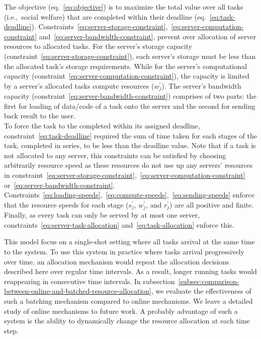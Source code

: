 The objective (eq.~\ref{eq:objective}) is to maximize the total value over all tasks (i.e.,\ social welfare) that
are completed within their deadline (eq.~\ref{eq:task-deadline}).
Constraints~\ref{eq:server-storage-constraint},~\ref{eq:server-computation-constraint}
and~\ref{eq:server-bandwidth-constraint}, prevent over allocation of server resources to allocated tasks.
For the server's storage capacity (constraint~\ref{eq:server-storage-constraint}), each server's storage must be less
than the allocated task's storage requirements. While for the server's computational capacity
(constraint~\ref{eq:server-computation-constraint}), the capacity is limited by a server's allocated tasks
compute resources ($w^{'}_j$). The server's bandwidth capacity (constraint~\ref{eq:server-bandwidth-constraint})
comprises of two parts: the first for loading of data/code of a task onto the server and the second for sending
back result to the user. \\
To force the task to the completed within its assigned deadline, constraint~\ref{eq:task-deadline} required the sum
of time taken for each stages of the task, completed in series, to be less than the deadline value.
Note that if a task is not allocated to any server, this constraints can be satisfied by choosing arbitrarily
resource speed as these resources do not use up any servers' resources in
constraint~\ref{eq:server-storage-constraint},~\ref{eq:server-computation-constraint}
or~\ref{eq:server-bandwidth-constraint}. \\
Constraints~\ref{eq:loading-speeds},~\ref{eq:compute-speeds},~\ref{eq:sending-speeds} enforce that the resource
speeds for each stage ($s^{'}_j$, $w^{'}_j$, and $r^{'}_j$) are all positive and finite.
Finally, as every task can only be served by at most one server, constraints~\ref{eq:server-task-allocation}
and~\ref{eq:task-allocation} enforce this.

This model focus on a single-shot setting where all tasks arrival at the same time to the system. To use this system
in practice where tasks arrival progressively over time, an allocation mechanism would repeat the allocation decisions
described here over regular time intervals. As a result, longer running tasks would reappearing in consecutive time
intervals.
In subsection~\ref{subsec:comparison-between-online-and-batched-resource-allocation}, we evaluate the effectiveness of
such a batching mechanism compared to online mechanisms. We leave a detailed study of online mechanisms to future work.
A probably advantage of such a system is the ability to dynamically change the resource allocation at each time step.

